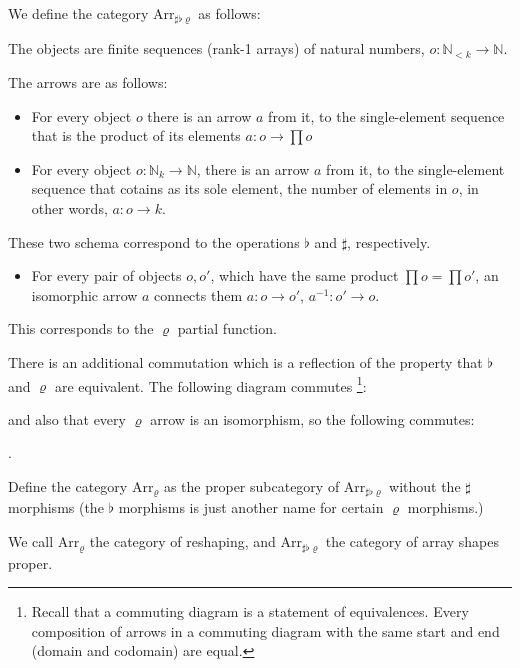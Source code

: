 \documentclass{DIKU-report-variant}
\newcommand\mrm[1]{\mathrm{#1}}
\newcommand\brm[1]{\bm{\mrm{#1}}}
\newcommand\Nat{\mathbb{N}}
\newcommand\Arr[1]{{\brm{Arr}_{\brm{#1}}}}
\newcommand\SFR{\sharp\flat\varrho}
\begin{document}
\begin{definition}
  \label{def:category-of-shapes}
  We define the category \(\Arr\SFR\) as follows:

  The objects are finite sequences (rank-1 arrays)
  of natural numbers, \(o : \Nat_{<k} \to \Nat\).

  The arrows are as follows:
  \begin{itemize}
    \item For every object \(o\)
      there is an arrow \(a\) from it, to the single-element sequence
      that is the product of its elements \(a : o \to \prod o\)
    \item For every object \(o : \Nat_k \to \Nat\),
      there is an arrow \(a\) from it, to the single-element sequence
      that cotains as its sole element, the number of elements in \(o\), in
      other words, \(a : o \to k\).
  \end{itemize}
  These two schema correspond to the operations \(\flat\) and \(\sharp\), respectively.

  \begin{itemize}
    \item For every pair of objects \(o, o'\), which have the same product
      \(\prod o = \prod o'\), an isomorphic arrow \(a\) connects them
      \( a : o \to o'\), \(a^{-1} : o' \to o\).
  \end{itemize}
  This corresponds to the \(\varrho\) partial function. 

  There is an additional commutation which is a reflection of the
  property that \(\flat\) and \(\varrho\) are equivalent.
  The following diagram commutes
    \footnote{Recall that a commuting diagram is a statement of equivalences. Every composition
    of arrows in a commuting diagram with the same start and end (domain and codomain) are equal.}:
  \begin{center}
  \end{center}
  and also that every \(\varrho\) arrow is an isomorphism, so the following commutes:
  \begin{center}
  .
  \end{center}

  Define the category \(\Arr\varrho\) as the proper subcategory of \(\Arr\SFR\) without the
  \(\sharp\) morphisms (the \(\flat\) morphisms is just another name for certain \(\varrho\) morphisms.)

  We call \(\Arr\varrho\) the category of reshaping, and \(\Arr\SFR\) the category of array
  shapes proper.
\end{definition}
\end{document}
